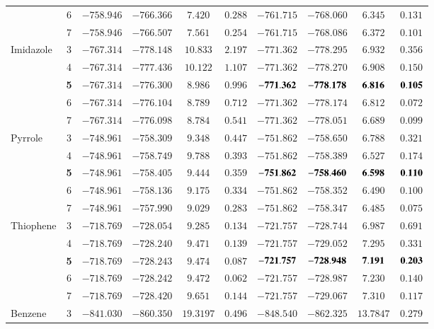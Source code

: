 \documentclass[aip,jcp,reprint,noshowkeys,superscriptaddress,floatfix]{revtex4-1}
\begin{document}
\begin{squeezetable}
\begin{table*}
\begin{ruledtabular}
\begin{tabular}{lccccccccc}
					&	6	&	$-758.946$	&	$-766.366$	&	$7.420$		&	$0.288$	&	$-761.715$	&	$-768.060$	&	$6.345$	&	$0.131$		\\
					&	7	&	$-758.946$	&	$-766.507$	&	$7.561$		&	$0.254$	&	$-761.715$	&	$-768.086$	&	$6.372$	&	$0.101$		\\
	\hline
	Imidazole		&	3	&	$-767.314$	&	$-778.148$	&	$10.833$	&	$2.197$	&	$-771.362$	&	$-778.295$	&	$6.932$	&	$0.356$		\\
					&	4	&	$-767.314$	&	$-777.436$	&	$10.122$	&	$1.107$	&	$-771.362$	&	$-778.270$	&	$6.908$	&	$0.150$		\\
					&\bf5	&	$-767.314$	&	$-776.300$	&	$8.986$		&	$0.996$	&$\bf-771.362$	&$\bf-778.178$	&$\bf6.816$	&$\bf0.105$		\\
					&	6	&	$-767.314$	&	$-776.104$	&	$8.789$		&	$0.712$	&	$-771.362$	&	$-778.174$	&	$6.812$	&	$0.072$		\\
					&	7	&	$-767.314$	&	$-776.098$	&	$8.784$		&	$0.541$	&	$-771.362$	&	$-778.051$	&	$6.689$	&	$0.099$		\\
	\hline
	Pyrrole			&	3	&	$-748.961$	&	$-758.309$	&	$9.348$		&	$0.447$	&	$-751.862$	&	$-758.650$	&	$6.788$	&	$0.321$		\\
					&	4	&	$-748.961$	&	$-758.749$	&	$9.788$		&	$0.393$	&	$-751.862$	&	$-758.389$	&	$6.527$	&	$0.174$		\\
					&\bf5	&	$-748.961$	&	$-758.405$	&	$9.444$		&	$0.359$	&$\bf-751.862$	&$\bf-758.460$	&$\bf6.598$	&$\bf0.110$		\\
					&	6	&	$-748.961$	&	$-758.136$	&	$9.175$		&	$0.334$	&	$-751.862$	&	$-758.352$	&	$6.490$	&	$0.100$		\\
					&	7	&	$-748.961$	&	$-757.990$	&	$9.029$		&	$0.283$	&	$-751.862$	&	$-758.347$	&	$6.485$	&	$0.075$		\\
	\hline
	Thiophene		&	3	&	$-718.769$	&	$-728.054$	&	$9.285$		&	$0.134$	&	$-721.757$	&	$-728.744$	&	$6.987$	&	$0.691$		\\
					&	4	&	$-718.769$	&	$-728.240$	&	$9.471$		&	$0.139$	&	$-721.757$	&	$-729.052$	&	$7.295$	&	$0.331$		\\
					&\bf5	&	$-718.769$	&	$-728.243$	&	$9.474$		&	$0.087$	&$\bf-721.757$	&$\bf-728.948$	&$\bf7.191$	&$\bf0.203$		\\
					&	6	&	$-718.769$	&	$-728.242$	&	$9.472$		&	$0.062$	&	$-721.757$	&	$-728.987$	&	$7.230$	&	$0.140$		\\
					&	7	&	$-718.769$	&	$-728.420$	&	$9.651$		&	$0.144$	&	$-721.757$	&	$-729.067$	&	$7.310$	&	$0.117$		\\
	\hline
	Benzene			&	3	&	$-841.030$	&	$-860.350$	&	$19.3197$	&	$0.496$	&	$-848.540$	&	$-862.325$	&	$13.7847$	&	$0.279$		\\

\end{tabular}
\end{ruledtabular}
\end{table*}
\end{squeezetable}
\end{document}
